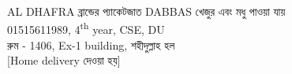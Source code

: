 \documentclass[a4paper,12pt]{article}
\begin{document}
\centering
{}
{ AL DHAFRA  ব্রান্ডের প্যাকেটজাত  DABBAS  খেজুর এবং মধু পাওয়া যায়\\01515611989, 4\textsuperscript{th} year, CSE, DU\\  রুম - 1406, Ex-1 building, শহীদুল্লাহ হল\\[Home delivery দেওয়া হয়] \\ \vspace{0.7cm}}
\end{document}

